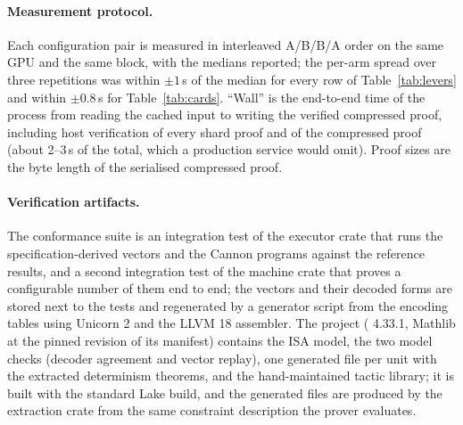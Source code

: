 \paragraph{Measurement protocol.} Each configuration pair is measured in interleaved A/B/B/A order on the same GPU and the same block, with the medians reported; the per-arm spread over three repetitions was within $\pm 1$\,s of the median for every row of Table~\ref{tab:levers} and within $\pm 0.8$\,s for Table~\ref{tab:cards}. ``Wall'' is the end-to-end time of the process from reading the cached input to writing the verified compressed proof, including host verification of every shard proof and of the compressed proof (about 2--3\,s of the total, which a production service would omit). Proof sizes are the byte length of the serialised compressed proof.

\paragraph{Verification artifacts.} The conformance suite is an integration test of the executor crate that runs the specification-derived vectors and the Cannon programs against the reference results, and a second integration test of the machine crate that proves a configurable number of them end to end; the vectors and their decoded forms are stored next to the tests and regenerated by a generator script from the encoding tables using Unicorn 2 and the LLVM 18 assembler. The \Lean{} project (\Lean{} 4.33.1, Mathlib at the pinned revision of its manifest) contains the ISA model, the two model checks (decoder agreement and vector replay), one generated file per unit with the extracted determinism theorems, and the hand-maintained tactic library; it is built with the standard Lake build, and the generated files are produced by the extraction crate from the same constraint description the prover evaluates.
